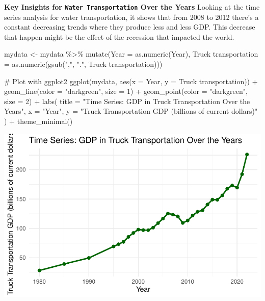 \documentclass[
  letterpaper,
  DIV=11,
  numbers=noendperiod]{scrreprt}
\newenvironment{Shaded}{\begin{snugshade}}{\end{snugshade}}
\newcommand{\AttributeTok}[1]{\textcolor[rgb]{0.40,0.45,0.13}{#1}}
\newcommand{\CommentTok}[1]{\textcolor[rgb]{0.37,0.37,0.37}{#1}}
\newcommand{\DecValTok}[1]{\textcolor[rgb]{0.68,0.00,0.00}{#1}}
\newcommand{\FunctionTok}[1]{\textcolor[rgb]{0.28,0.35,0.67}{#1}}
\newcommand{\NormalTok}[1]{\textcolor[rgb]{0.00,0.23,0.31}{#1}}
\newcommand{\OtherTok}[1]{\textcolor[rgb]{0.00,0.23,0.31}{#1}}
\newcommand{\SpecialCharTok}[1]{\textcolor[rgb]{0.37,0.37,0.37}{#1}}
\newcommand{\StringTok}[1]{\textcolor[rgb]{0.13,0.47,0.30}{#1}}
\begin{document}
\textbf{Key Insights for \texttt{Water\ Transportation} Over the Years}
Looking at the time series analysis for water transportation, it shows
that from 2008 to 2012 there's a constant decreasing trends where they
produce less and less GDP. This decrease that happen might be the effect
of the recession that impacted the world.

\begin{Shaded}
\begin{Highlighting}[]
\NormalTok{mydata }\OtherTok{\textless{}{-}}\NormalTok{ mydata }\SpecialCharTok{\%\textgreater{}\%}
  \FunctionTok{mutate}\NormalTok{(}\AttributeTok{Year =} \FunctionTok{as.numeric}\NormalTok{(Year),}
         \StringTok{\textasciigrave{}}\AttributeTok{Truck transportation}\StringTok{\textasciigrave{}} \OtherTok{=} \FunctionTok{as.numeric}\NormalTok{(}\FunctionTok{gsub}\NormalTok{(}\StringTok{","}\NormalTok{, }\StringTok{"."}\NormalTok{, }\StringTok{\textasciigrave{}}\AttributeTok{Truck transportation}\StringTok{\textasciigrave{}}\NormalTok{)))}

\CommentTok{\# Plot with ggplot2}
\FunctionTok{ggplot}\NormalTok{(mydata, }\FunctionTok{aes}\NormalTok{(}\AttributeTok{x =}\NormalTok{ Year, }\AttributeTok{y =} \StringTok{\textasciigrave{}}\AttributeTok{Truck transportation}\StringTok{\textasciigrave{}}\NormalTok{)) }\SpecialCharTok{+}
  \FunctionTok{geom\_line}\NormalTok{(}\AttributeTok{color =} \StringTok{"darkgreen"}\NormalTok{, }\AttributeTok{size =} \DecValTok{1}\NormalTok{) }\SpecialCharTok{+}
  \FunctionTok{geom\_point}\NormalTok{(}\AttributeTok{color =} \StringTok{"darkgreen"}\NormalTok{, }\AttributeTok{size =} \DecValTok{2}\NormalTok{) }\SpecialCharTok{+}
  \FunctionTok{labs}\NormalTok{(}
    \AttributeTok{title =} \StringTok{"Time Series: GDP in Truck Transportation Over the Years"}\NormalTok{,}
    \AttributeTok{x =} \StringTok{"Year"}\NormalTok{,}
    \AttributeTok{y =} \StringTok{"Truck Transportation GDP (billions of current dollars)"}
\NormalTok{  ) }\SpecialCharTok{+}
  \FunctionTok{theme\_minimal}\NormalTok{()}
\end{Highlighting}
\end{Shaded}

\includegraphics{FinalProject_Abigail_files/figure-pdf/unnamed-chunk-5-1.pdf}
\end{document}
